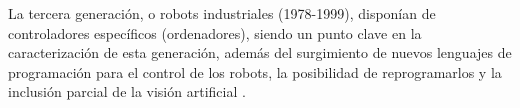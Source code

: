   
  
  
  
La tercera generación, o robots industriales (1978-1999), disponían de controladores específicos (ordenadores), siendo un punto clave en la caracterización de esta generación, además del surgimiento de nuevos lenguajes de programación para el control de los robots, la posibilidad de reprogramarlos y la inclusión parcial de la visión artificial \cite{Zamalloa17}.\\ %

